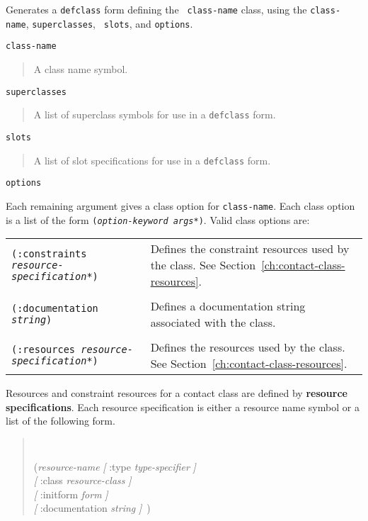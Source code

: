 \begin{flushright} 
\parbox[t]{6.125in}{
Generates a {\tt defclass} form defining the {\tt
class-name} class, using the {\tt class-name}, {\tt superclasses}, {\tt
slots}, and {\tt options}.  
}

\parbox[t]{6.125in}{
{\tt class-name}
\begin{quote}
A class name symbol.   
\end{quote}
}
 
\parbox[t]{6.125in}{
{\tt superclasses}
\begin{quote}
A list of superclass symbols for use in a {\tt defclass} form. 
\end{quote}
}

\parbox[t]{6.125in}{
{\tt slots}
\begin{quote}
A list of slot specifications for use in a {\tt defclass} form. 
\end{quote}
}

\parbox[t]{6.125in}{
{\tt options}
}

\parbox[t]{5.75in}{
Each  remaining argument gives a class option for {\tt class-name}.
Each class option is a list of the form {\tt ({\em option-keyword
args*})}.  Valid class options are: 

\begin{center}
\begin{tabular}{lp{2.5in}}
{\tt (:constraints {\em resource-specification*})} & 
Defines the constraint resources used by the class. See
Section~\ref{ch:contact-class-resources}.\index{resource} \\ \\

{\tt (:documentation {\em string})} & 
Defines a documentation string associated with the class.\\ \\

{\tt (:resources {\em resource-specification*})} & 
Defines the resources used by the class. See
Section~\ref{ch:contact-class-resources}.\index{resource} \\
\end{tabular}
\end{center}
}
\end{flushright}

Resources and constraint resources for a contact class are defined by
{\bf resource specifications}. Each resource
specification 
is either a resource name symbol or a list of the following form.
\begin{quotation}
\tt
\begin{tabbing}
({\em resource-name} \= {\em [} :type {\em type-specifier} {\em ]}\\
\> {\em [} :class {\em resource-class} {\em ]}\\
\> {\em [} :initform {\em form} {\em ]} \\
\> {\em [} :documentation {\em string} {\em ]}\ )
\end{tabbing}
\end{quotation}


